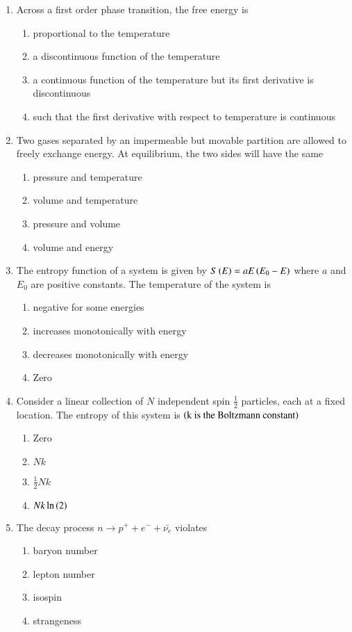 \documentclass[journal,12pt,onecolumn]{IEEEtran}
\theoremstyle{remark}
\begin{document}
\begin{enumerate}
\item Across a first order phase transition, the free energy is
\begin{enumerate}
\item proportional to the temperature
\item a discontinuous function of the temperature
\item a continuous function of the temperature but its first derivative is discontinuous
\item such that the first derivative with respect to temperature is continuous
\end{enumerate}

\item Two gases separated by an impermeable but movable partition are allowed to freely exchange energy. At equilibrium, the two sides will have the same
\begin{enumerate}
\item pressure and temperature
\item volume and temperature
\item pressure and volume
\item volume and energy
\end{enumerate}

\item The entropy function of a system is given by $S\left(E\right) = aE\left(E_0 - E\right)$ where $a$ and $E_0$ are positive constants. The temperature of the system is
\begin{enumerate}
\item negative for some energies 
\item increases monotonically with energy
\item decreases monotonically with energy
\item Zero
\end{enumerate}

\item Consider a linear collection of $N$ independent spin $\frac{1}{2}$ particles, each at a fixed location. The entropy of this system is $\left(\text{k is the Boltzmann constant}\right)$
\begin{enumerate}
\item Zero
\item $Nk$
\item $\frac{1}{2}Nk$
\item $Nk\ln\left(2\right)$
\end{enumerate}

\item The decay process $n \to p^+ + e^- + \bar{\nu_e}$ violates
\begin{enumerate}
\item baryon number
\item lepton number
\item isospin
\item strangeness
\end{enumerate}


\end{enumerate}
\end{document}

